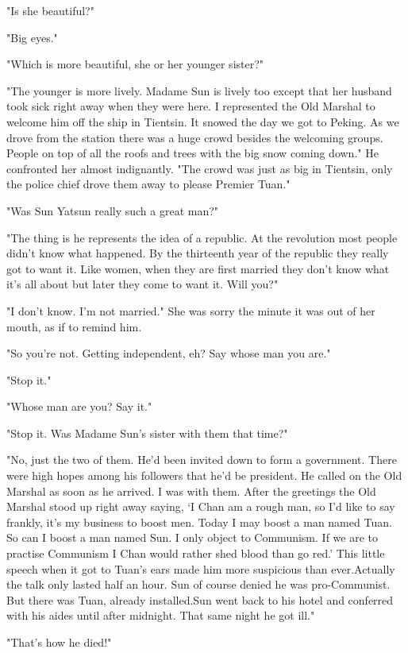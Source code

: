 \par "Is she beautiful?"
\par "Big eyes."
\par "Which is more beautiful, she or her younger sister?"
\par "The younger is more lively. Madame Sun is lively too except that her husband took sick right away when they were here. I represented the Old Marshal to welcome him off the ship in Tientsin. It snowed the day we got to Peking. As we drove from the station there was a huge crowd besides the welcoming groups. People on top of all the roofs and trees with the big snow coming down." He confronted her almost indignantly. "The crowd was just as big in Tientsin, only the police chief drove them away to please Premier Tuan."
\par "Was Sun Yatsun really such a great man?"
\par "The thing is he represents the idea of a republic. At the revolution most people didn't know what happened. By the thirteenth year of the republic they really got to want it. Like women, when they are first married they don't know what it's all about but later they come to want it. Will you?"
\par "I don't know. I'm not married." She was sorry the minute it was out of her mouth, as if to remind him.
\par "So you're not. Getting independent, eh? Say whose man you are."
\par "Stop it."
\par "Whose man are you? Say it."
\par "Stop it. Was Madame Sun's sister with them that time?"
\par "No, just the two of them. He'd been invited down to form a government. There were high hopes among his followers that he'd be president. He called on the Old Marshal as soon as he arrived. I was with them. After the greetings the Old Marshal stood up right away saying, ‘I Chan am a rough man, so I'd like to say frankly, it's my business to boost men. Today I may boost a man named Tuan. So can I boost a man named Sun. I only object to Communism. If we are to practise Communism I Chan would rather shed blood than go red.' This little speech when it got to Tuan's ears made him more suspicious than ever.Actually the talk only lasted half an hour. Sun of course denied he was pro-Communist. But there was Tuan, already installed.Sun went back to his hotel and conferred with his aides until after midnight. That same night he got ill."
\par "That's how he died!"
